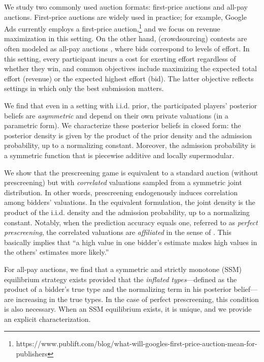 We study two commonly used auction formats: first-price auctions and all-pay auctions. First-price auctions are widely used in practice; for example, Google Ads currently employs a first-price auction,\footnote{https://www.publift.com/blog/what-will-googles-first-price-auction-mean-for-publishers} and we focus on revenue maximization in this setting. On the other hand, (crowdsourcing) contests are often modeled as all-pay auctions \citep{Moldovanu_2001_AER_WTA_Optimial, moldovanu_2006_contest_architecture, Liu_2023_optimal_reward_negativeprizes}, where bids correspond to levels of effort. In this setting, every participant incurs a cost for exerting effort regardless of whether they win, and common objectives include maximizing the expected total effort (revenue) or the expected highest effort (bid). The latter objective reflects settings in which only the best submission matters.%





We find that even in a setting with i.i.d. prior, the participated players' posterior beliefs are \textit{asymmetric} and depend on their own private valuations (in a parametric form). We characterize these posterior beliefs in closed form: the posterior density is given by the product of the prior density and the admission probability, up to a normalizing constant. Moreover, the admission probability is a symmetric function that is piecewise additive and locally supermodular.

We show that the prescreening game is equivalent to a standard auction (without prescreening) but with \emph{correlated} valuations sampled from a symmetric joint distribution. 
In other words, prescreening endogenously induces correlation among bidders' valuations. 
In the equivalent formulation, the joint density is the product of the i.i.d. density and the admission probability, up to a normalizing constant. Notably, when the prediction accuracy equals one, referred to as \emph{perfect prescreening},  the correlated valuations are \emph{affiliated} in the sense of \citet{milgrom_1982_auctiontheory_competitive_bidding}. This basically implies that ``a high value in one bidder’s estimate makes high values in the others’ estimates more likely.''

For all-pay auctions, we find that a symmetric and strictly monotone (SSM) equilibrium strategy exists provided that the \emph{inflated types}---defined as the product of a bidder's true type and the normalizing term in his posterior belief---are increasing in the true types. In the case of perfect prescreening, this condition is also necessary. When an SSM equilibrium exists, it is unique, and we provide an explicit characterization.


